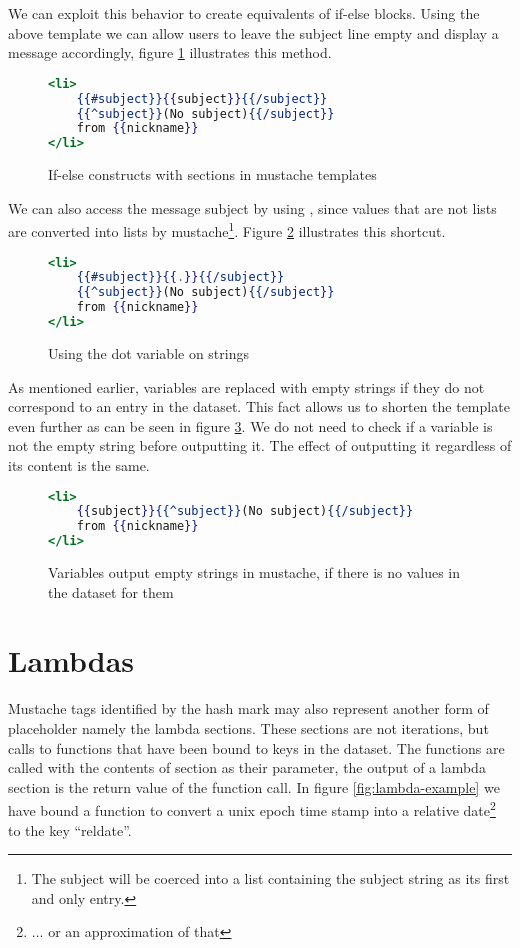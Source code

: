\documentclass[thesis.tex]{subfiles}
\begin{document}
We can exploit this behavior to create equivalents of if-else blocks.
Using the above template we can allow users to leave the subject line empty
and display a message accordingly, figure \ref{fig:ifelse.mustache} illustrates
this method.
\begin{figure}
	\centering
	\begin{lstlisting}[language=mustache]
<li>
	{{#subject}}{{subject}}{{/subject}}
	{{^subject}}(No subject){{/subject}}
	from {{nickname}}
</li>
	\end{lstlisting}
	\caption{If-else constructs with sections in mustache templates}
	\label{fig:ifelse.mustache}
\end{figure}

We can also access the message subject by using ,
since values that are not lists are converted into lists by mustache\footnote{
	The subject will be coerced into a list containing the subject string as its
	first and only entry.
}. Figure \ref{fig:dot-oper2.mustache} illustrates this shortcut.

\begin{figure}
	\centering
	\begin{lstlisting}[language=mustache]
<li>
	{{#subject}}{{.}}{{/subject}}
	{{^subject}}(No subject){{/subject}}
	from {{nickname}}
</li>
	\end{lstlisting}
	\caption{Using the dot variable on strings}
	\label{fig:dot-oper2.mustache}
\end{figure}

As mentioned earlier, variables are replaced with empty strings if
they do not correspond to an entry in the dataset.
This fact allows us to shorten the template even further as can be seen in
figure \ref{fig:emptystr.mustache}.
We do not need to check if a variable is not the empty string before outputting
it. The effect of outputting it regardless of its content is the same.

\begin{figure}
	\centering
	\begin{lstlisting}[language=mustache]
<li>
	{{subject}}{{^subject}}(No subject){{/subject}}
	from {{nickname}}
</li>
	\end{lstlisting}
	\caption{Variables output empty strings in mustache, if there is no values in the dataset for them}
	\label{fig:emptystr.mustache}
\end{figure}

\section{Lambdas}
Mustache tags identified by the hash mark may also represent another form of
placeholder namely the lambda sections. These sections are not iterations, but
calls to functions that have been bound to keys in the dataset.
The functions are called with the contents of section as their parameter, the
output of a lambda section is the return value of the function call.
In figure \ref{fig:lambda-example} we have bound a function to convert a
unix epoch time stamp into a relative date\footnote{... or an approximation of that}
to the key ``reldate''.
\end{document}
